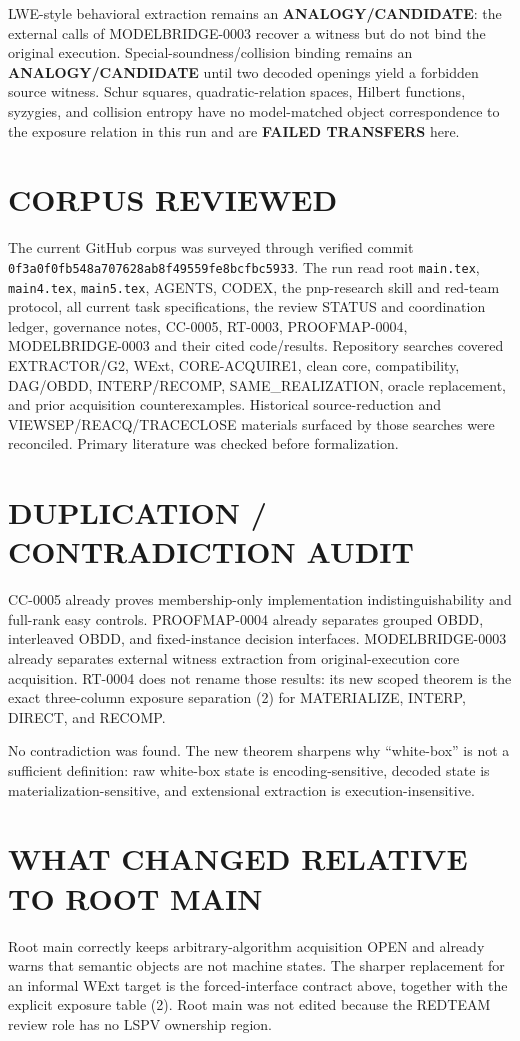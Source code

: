 \documentclass[11pt]{article}
\begin{document}
LWE-style behavioral extraction remains an \textbf{ANALOGY/CANDIDATE}: the
external calls of MODELBRIDGE-0003 recover a witness but do not bind the
original execution.  Special-soundness/collision binding remains an
\textbf{ANALOGY/CANDIDATE} until two decoded openings yield a forbidden
source witness.  Schur squares, quadratic-relation spaces, Hilbert functions,
syzygies, and collision entropy have no model-matched object correspondence
to the exposure relation in this run and are \textbf{FAILED TRANSFERS} here.

\section{CORPUS REVIEWED}
The current GitHub corpus was surveyed through verified commit
\texttt{0f3a0f0fb548a707628ab8f49559fe8bcfbc5933}.  The run read root
\texttt{main.tex}, \texttt{main4.tex}, \texttt{main5.tex}, AGENTS, CODEX,
the pnp-research skill and red-team protocol, all current task specifications,
the review STATUS and coordination ledger, governance notes, CC-0005,
RT-0003, PROOFMAP-0004, MODELBRIDGE-0003 and their cited code/results.
Repository searches covered EXTRACTOR/G2, WExt, CORE-ACQUIRE1, clean core,
compatibility, DAG/OBDD, INTERP/RECOMP, SAME\_REALIZATION, oracle replacement,
and prior acquisition counterexamples.  Historical source-reduction and
VIEWSEP/REACQ/TRACECLOSE materials surfaced by those searches were reconciled.
Primary literature was checked before formalization.

\section{DUPLICATION / CONTRADICTION AUDIT}
CC-0005 already proves membership-only implementation indistinguishability
and full-rank easy controls.  PROOFMAP-0004 already separates grouped OBDD,
interleaved OBDD, and fixed-instance decision interfaces.  MODELBRIDGE-0003
already separates external witness extraction from original-execution core
acquisition.  RT-0004 does not rename those results: its new scoped theorem is
the exact three-column exposure separation (2) for MATERIALIZE, INTERP,
DIRECT, and RECOMP.

No contradiction was found.  The new theorem sharpens why ``white-box'' is
not a sufficient definition: raw white-box state is encoding-sensitive,
decoded state is materialization-sensitive, and extensional extraction is
execution-insensitive.

\section{WHAT CHANGED RELATIVE TO ROOT MAIN}
Root main correctly keeps arbitrary-algorithm acquisition OPEN and already
warns that semantic objects are not machine states.  The sharper replacement
for an informal WExt target is the forced-interface contract above, together
with the explicit exposure table (2).  Root main was not edited because the
REDTEAM review role has no LSPV ownership region.
\end{document}
